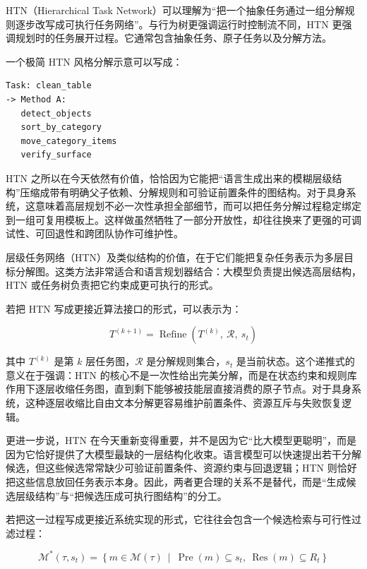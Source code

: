 HTN（Hierarchical Task Network）可以理解为“把一个抽象任务通过一组分解规则逐步改写成可执行任务网络”。与行为树更强调运行时控制流不同，HTN 更强调规划时的任务展开过程。它通常包含抽象任务、原子任务以及分解方法。

一个极简 HTN 风格分解示意可以写成：

\begin{lstlisting}
Task: clean_table
-> Method A:
   detect_objects
   sort_by_category
   move_category_items
   verify_surface
\end{lstlisting}

HTN 之所以在今天依然有价值，恰恰因为它能把“语言生成出来的模糊层级结构”压缩成带有明确父子依赖、分解规则和可验证前置条件的图结构。对于具身系统，这意味着高层规划不必一次性承担全部细节，而可以把任务分解过程稳定绑定到一组可复用模板上。这样做虽然牺牲了一部分开放性，却往往换来了更强的可调试性、可回退性和跨团队协作可维护性。

层级任务网络（HTN）及类似结构的价值，在于它们能把复杂任务表示为多层目标分解图。这类方法非常适合和语言规划器结合：大模型负责提出候选高层结构，HTN 或任务树负责把它约束成更可执行的形式。

若把 HTN 写成更接近算法接口的形式，可以表示为：

\begingroup
\footnotesize
\begin{equation*}
T^{(k+1)} = \operatorname{Refine}(T^{(k)},\ \mathcal{R},\ s_t)
\end{equation*}
\endgroup

其中 \(T^{(k)}\) 是第 \(k\) 层任务图，\(\mathcal{R}\) 是分解规则集合，\(s_t\) 是当前状态。这个递推式的意义在于强调：HTN 的核心不是一次性给出完美分解，而是在状态约束和规则库作用下逐层收缩任务图，直到剩下能够被技能层直接消费的原子节点。对于具身系统，这种逐层收缩比自由文本分解更容易维护前置条件、资源互斥与失败恢复逻辑。

更进一步说，HTN 在今天重新变得重要，并不是因为它“比大模型更聪明”，而是因为它恰好提供了大模型最缺的一层结构化收束。语言模型可以快速提出若干分解候选，但这些候选常常缺少可验证前置条件、资源约束与回退逻辑；HTN 则恰好把这些信息放回任务表示本身。因此，两者更合理的关系不是替代，而是“生成候选层级结构”与“把候选压成可执行图结构”的分工。

若把这一过程写成更接近系统实现的形式，它往往会包含一个候选检索与可行性过滤过程：

\begingroup
\scriptsize
\begin{equation*}
\mathcal{M}^{*}(\tau, s_t)=
\left\{
m\in\mathcal{M}(\tau)\ \middle|\ 
\operatorname{Pre}(m)\subseteq s_t,\ 
\operatorname{Res}(m)\subseteq R_t
\right\}
\end{equation*}
\endgroup

